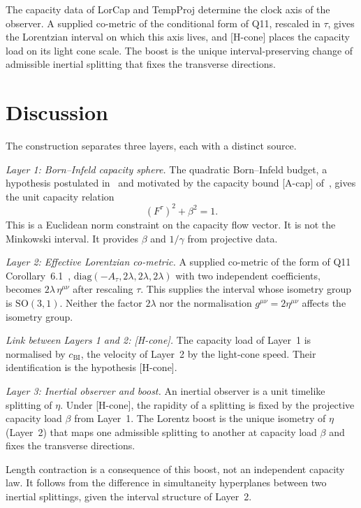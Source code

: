 \documentclass[12pt,a4paper]{article}
\theoremstyle{remark}
\theoremstyle{definition}
\newcommand{\SO}{\mathrm{SO}}
\begin{document}
    The capacity data of LorCap and TempProj determine the clock axis of the observer.
    A supplied co-metric of the conditional form of Q11, rescaled in $\tau$, gives the Lorentzian interval on which
    this axis lives, and [H-cone] places the capacity load on its light cone scale.
    The boost is the unique interval-preserving change of admissible inertial splitting that fixes the transverse
    directions.

  \section{Discussion}
    \label{sec:discussion}

    The construction separates three layers, each with a distinct source.

    \textit{Layer 1: Born--Infeld capacity sphere.}
    The quadratic Born--Infeld budget, a hypothesis postulated in~\cite{Beau2026n} and motivated by the capacity
    bound [A-cap] of~\cite{Beau2026c}, gives the unit capacity relation
    \[
      (F^\tau)^2 + \beta^2 = 1.
    \]
    This is a Euclidean norm constraint on the capacity flow vector.
    It is not the Minkowski interval.
    It provides $\beta$ and $1/\gamma$ from projective data.

    \textit{Layer 2: Effective Lorentzian co-metric.}
    A supplied co-metric of the form of Q11 Corollary~6.1~\cite{Beau2026q11},
    $\mathrm{diag}(-A_\tau, 2\lambda, 2\lambda, 2\lambda)$ with two independent coefficients, becomes
    $2\lambda\,\eta^{\mu\nu}$ after rescaling $\tau$.
    This supplies the interval whose isometry group is $\SO(3,1)$.
    Neither the factor $2\lambda$ nor the normalisation $g^{\mu\nu} = 2\eta^{\mu\nu}$ affects the isometry group.

    \textit{Link between Layers 1 and 2: [H-cone].}
    The capacity load of Layer~1 is normalised by $c_{\mathrm{BI}}$, the velocity of Layer~2 by the light-cone
    speed.
    Their identification is the hypothesis [H-cone].

    \textit{Layer 3: Inertial observer and boost.}
    An inertial observer is a unit timelike splitting of $\eta$.
    Under [H-cone], the rapidity of a splitting is fixed by the projective capacity load $\beta$ from
    Layer~1.
    The Lorentz boost is the unique isometry of $\eta$ (Layer~2) that maps one admissible
    splitting to another at capacity load $\beta$ and fixes the transverse directions.

    Length contraction is a consequence of this boost, not an independent capacity law.
    It follows from the difference in simultaneity hyperplanes between two inertial
    splittings, given the interval structure of Layer~2.
\end{document}
